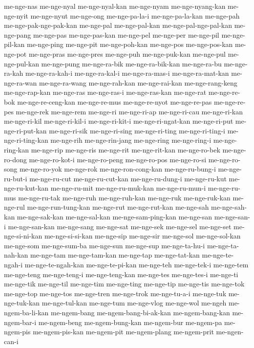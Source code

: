 {me-nge-nas me-nge-nyal me-nge-nyal-kan me-nge-nyam me-nge-nyang-kan
me-nge-nyit me-nge-nyut me-nge-ong me-nge-pa-la-i me-nge-pa-la-kan
me-nge-pah me-nge-pak-nge-pak-kan me-nge-pal me-nge-pal-kan
me-nge-pal-nge-pal-kan me-nge-pang me-nge-pas me-nge-pas-kan me-nge-pel
me-nge-per me-nge-pil me-nge-pil-kan me-nge-ping me-nge-pit me-nge-poh-kan
me-nge-pos me-nge-pos-kan me-nge-pot me-nge-pras me-nge-pres me-nge-puh
me-nge-puk-kan me-nge-pul me-nge-pul-kan me-nge-pung me-nge-ra-bik
me-nge-ra-bik-kan me-nge-ra-bu me-nge-ra-kah me-nge-ra-kah-i
me-nge-ra-kal-i me-nge-ra-mas-i me-nge-ra-mat-kan me-nge-ra-wan
me-nge-ra-wang me-nge-rah-kan me-nge-rai-kan me-nge-rang-keng
me-nge-rap-kan me-nge-ras me-nge-ras-i me-nge-ras-kan me-nge-rat
me-nge-re-bok me-nge-re-ceng-kan me-nge-re-mus me-nge-re-nyot
me-nge-re-pas me-nge-re-pes me-nge-rek me-nge-rem me-nge-ri me-nge-ri-ap
me-nge-ri-cau me-nge-ri-kan me-nge-ri-kil me-nge-ri-kil-i me-nge-ri-kit-i
me-nge-ri-ngat-kan me-nge-ri-put me-nge-ri-put-kan me-nge-ri-sik
me-nge-ri-sing me-nge-ri-ting me-nge-ri-ting-i me-nge-ri-ting-kan
me-nge-rih me-nge-rin-jang me-nge-ring me-nge-ring-i me-nge-ring-kan
me-nge-rip me-nge-ris me-nge-rit me-nge-rit-kan me-nge-ro-bek
me-nge-ro-dong me-nge-ro-kot-i me-nge-ro-peng me-nge-ro-pos me-nge-ro-si
me-nge-ro-song me-nge-ro-yok me-nge-rok me-nge-ron-cong-kan
me-nge-ru-bung-i me-nge-ru-but-i me-nge-ru-cut me-nge-ru-cut-kan
me-nge-ru-dung-i me-nge-ru-kut me-nge-ru-kut-kan me-nge-ru-mit
me-nge-ru-muk-kan me-nge-ru-mun-i me-nge-ru-mus me-nge-ru-tak me-nge-ruh
me-nge-ruh-kan me-nge-ruk me-nge-ruk-kan me-nge-rul me-nge-run-tung-kan
me-nge-rut me-nge-rut-kan me-nge-sah me-nge-sah-kan me-nge-sak-kan
me-nge-sal-kan me-nge-sam-ping-kan me-nge-san me-nge-san-i me-nge-san-kan
me-nge-sang me-nge-sat me-nge-sek me-nge-sel me-nge-set me-nge-si-ni-kan
me-nge-si-si-kan me-nge-sip me-nge-sir me-nge-sol me-nge-sol-kan
me-nge-som me-nge-sum-ba me-nge-sun me-nge-sup me-nge-ta-hu-i
me-nge-ta-nah-kan me-nge-tam me-nge-tam-kan me-nge-tap me-nge-tat-kan
me-nge-te-ngah-i me-nge-te-ngah-kan me-nge-te-pi-kan me-nge-teh
me-nge-tek-i me-nge-tem me-nge-teng me-nge-teng-i me-nge-teng-kan
me-nge-tes me-nge-tes-i me-nge-ti me-nge-tik me-nge-til me-nge-tim
me-nge-ting me-nge-tip me-nge-tis me-nge-tok me-nge-top me-nge-tos
me-nge-tren me-nge-trok me-nge-tu-a-i me-nge-tuk me-nge-tuk-kan
me-nge-tul-kan me-nge-tum me-nge-vlog me-nge-wol me-ngeh me-ngem-ba-li-kan
me-ngem-bang me-ngem-bang-bi-ak-kan me-ngem-bang-kan me-ngem-bar-i
me-ngem-beng me-ngem-bung-kan me-ngem-bur me-ngem-pa me-ngem-pis
me-ngem-pis-kan me-ngem-pit me-ngem-plang me-ngem-prit me-ngen-can-i
}

